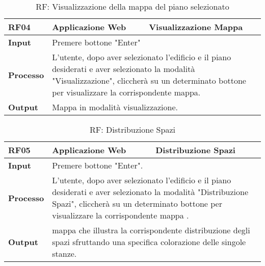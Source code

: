 \begin{table}[ht]
\caption{RF: Visualizzazione della mappa del piano selezionato}
\begin{center}
\begin{tabular}{|p{3cm}|p{4cm}|p{5cm}|}
\hline
\textbf{RF04}&\textbf{Applicazione Web}&\textbf{Visualizzazione Mappa}\\
\hline
\textbf{Input}&\multicolumn{2}{|p{9cm}|}{
Premere bottone "Enter" }\\
\hline
\textbf{Processo}&\multicolumn{2}{|p{9cm}|}{
L'utente, dopo aver selezionato l'edificio e il piano desiderati e aver selezionato la modalit\`a "Visualizzazione", cliccher\`a su un determinato bottone per visualizzare la corrispondente mappa.
}\\
\hline
\textbf{Output}&\multicolumn{2}{|p{9cm}|}{
Mappa in modalit\`a visualizzazione.
}\\
\hline
\end{tabular}
\end{center}
\label{Visualizzazione mappa}
\end{table}
\begin{table}[ht]
\caption{RF: Distribuzione Spazi}
\begin{center}
\begin{tabular}{|p{3cm}|p{4cm}|p{5cm}|}
\hline
\textbf{RF05}&\textbf{Applicazione Web}&\textbf{Distribuzione Spazi}\\
\hline
\textbf{Input}&\multicolumn{2}{|p{9cm}|}{
Premere bottone "Enter".}\\
\hline
\textbf{Processo}&\multicolumn{2}{|p{9cm}|}{
L'utente, dopo aver selezionato l'edificio e il piano desiderati e aver selezionato la modalit\`a "Distribuzione Spazi", cliccher\`a su un determinato bottone per visualizzare la corrispondente mappa .
}\\
\hline
\textbf{Output}&\multicolumn{2}{|p{9cm}|}{
mappa che illustra la corrispondente distribuzione degli spazi sfruttando una specifica colorazione delle singole stanze.
}\\
\hline
\end{tabular}
\end{center}
\label{Distribuzione Spazi}
\end{table}
